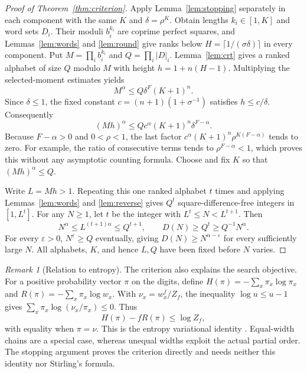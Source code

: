\documentclass[11pt]{article}
\theoremstyle{definition}
\theoremstyle{remark}
\newtheorem{remark}[theorem]{Remark}
\newcommand{\card}[1]{\lvert #1\rvert}
\begin{document}
\begin{proof}[Proof of Theorem~\ref{thm:criterion}]
Apply Lemma~\ref{lem:stopping} separately in each component with the same
$K$ and $\delta=\rho^K$. Obtain lengths $k_i\in[1,K]$ and word sets $D_i$.
Their moduli $b_i^{k_i}$ are coprime perfect squares, and
Lemmas~\ref{lem:words} and \ref{lem:round} give ranks below
$H=\lceil1/(\sigma\delta)\rceil$ in every component.
Put $M=\prod_ib_i^{k_i}$ and $Q=\prod_i\card D_i$.
Lemma~\ref{lem:crt} gives a ranked alphabet of size $Q$ modulo $M$ with
height $h=1+n(H-1)$. Multiplying the selected-moment estimates yields
\begin{equation}\label{eq:productmoment}
 M^\alpha\le Q\delta^F(K+1)^n.
\end{equation}
Since $\delta\le1$, the fixed constant $c=(n+1)(1+\sigma^{-1})$ satisfies
$h\le c/\delta$. Consequently
\[
 (Mh)^\alpha\le Qc^\alpha(K+1)^n\delta^{F-\alpha}.
\]
Because $F-\alpha>0$ and $0<\rho<1$, the last factor
$c^\alpha(K+1)^n\rho^{K(F-\alpha)}$ tends to zero.
For example, the ratio of consecutive terms tends to
$\rho^{F-\alpha}<1$, which proves this without any asymptotic counting
formula. Choose and fix $K$ so that $(Mh)^\alpha\le Q$.

Write $L=Mh>1$. Repeating this one ranked alphabet $t$ times and applying
Lemmas~\ref{lem:words} and \ref{lem:reverse} gives $Q^t$ square-difference-free
integers in $[1,L^t]$. For any $N\ge1$, let $t$ be the integer with
$L^t\le N<L^{t+1}$. Then
\[
 N^\alpha\le L^{(t+1)\alpha}\le Q^{t+1},\qquad
 D(N)\ge Q^t\ge Q^{-1}N^\alpha.
\]
For every $\varepsilon>0$, $N^\varepsilon\ge Q$ eventually, giving
$D(N)\ge N^{\alpha-\varepsilon}$ for every sufficiently large $N$.
All alphabets, $K$, and hence $L,Q$ have been fixed before $N$ varies.
\end{proof}

\begin{remark}[Relation to entropy]\label{rem:entropy}
The criterion also explains the search objective. For a positive probability
vector $\pi$ on the digits, define
$H(\pi)=-\sum_x\pi_x\log\pi_x$ and
$R(\pi)=-\sum_x\pi_x\log w_x$. With
$\nu_x=w_x^f/Z_f$, the inequality $\log u\le u-1$ gives
$\sum_x\pi_x\log(\nu_x/\pi_x)\le0$. Thus
\[
 H(\pi)-fR(\pi)\le\log Z_f,
\]
with equality when $\pi=\nu$. This is the entropy variational identity
\cite{CoverThomas2006}. Equal-width chains are a special case, whereas
unequal widths exploit the actual partial order. The stopping argument
proves the criterion directly and needs neither this identity nor Stirling's
formula.
\end{remark}
\end{document}
